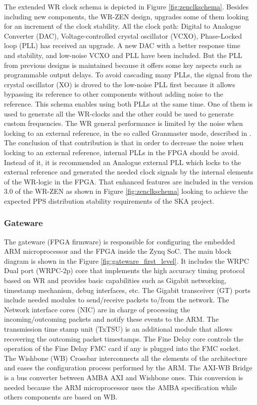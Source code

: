 The extended WR clock schema is depicted in Figure \ref{fig:zenclkschema}.
Besides including new components, the WR-ZEN design, upgrades some of them
looking for an increment of the clock stability. All the clock path: Digital to
Analogue Converter (DAC), Voltage-controlled crystal oscillator (VCXO),
Phase-Locked loop (PLL) has received an upgrade. A new DAC with a better
response time and stability, and low-noise VCXO and PLL have been included. But
the PLL from previous designs is maintained because it offers some key aspects
such as programmable output delays. To avoid cascading many PLLs, the signal
from the crystal oscillator (XO) is droved to the low-noise PLL first because
it allows bypassing its reference to other components without adding noise to
the reference. This schema enables using both PLLs at the same time. One of
them is used to generate all the WR-clocks and the other could be used to
generate custom frequencies. The WR general performance is limited by the noise
when locking to an external reference, in the so called Granmaster mode,
described in \cite{Rizzi2016}. The conclusion of that contribution is that in
order to decrease the noise when locking to an external reference, internal
PLLs in the FPGA should be avoid. Instead of it, it is recommended an Analogue
external PLL which locks to the external reference and generated the needed
clock signals by the internal elements of the WR-logic in the FPGA. That
enhanced features are included in the version 3.0 of the WR-ZEN as shown in
Figure \ref{fig:zenclkschema} looking to achieve the expected PPS distribution
stability requirements of the SKA project.


\subsubsection{Gateware} \label{subsec:gateware}

The gateware (FPGA firmware) is responsible for configuring the embedded ARM
microprocessor and the FPGA inside the Zynq SoC. The main block diagram is
shown in the Figure \ref{fig:gateware_first_level}. It includes the WRPC Dual
port (WRPC-2p) core that implements the high accuracy timing protocol based on
WR and provides basic capabilities such as Gigabit networking, timestamp
mechanism, debug interfaces, etc. The Gigabit transceiver (GT) ports include
needed modules to send/receive packets to/from the network. The Network
interface cores (NIC) are in charge of processing the incoming/outcoming
packets and notify these events to the ARM. The transmission time stamp unit
(TxTSU) is an additional module that allows recovering the outcoming packet
timestamps. The Fine Delay core controls the operation of the Fine Delay FMC
card if any is plugged into the FMC socket. The Wishbone (WB) Crossbar
interconnects all the elements of the architecture and eases the configuration
process performed by the ARM. The AXI-WB Bridge is a bus converter between AMBA
AXI and Wishbone ones. This conversion is needed because the ARM microprocessor
uses the AMBA specification while others components are based on WB.

